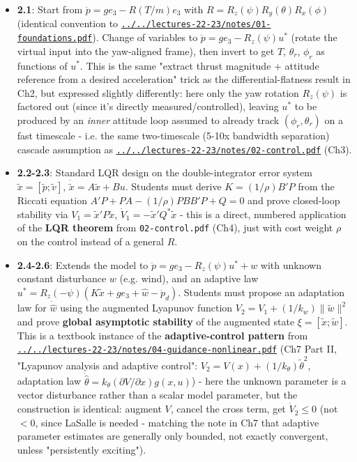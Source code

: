 \documentclass[11pt]{article}
\begin{document}
\begin{itemize}
\item \textbf{2.1}: Start from $\ddot p = ge_3 - R(T/m)e_3$ with $R = R_z(\psi)R_y(\theta)R_x(\phi)$ (identical convention to \href{../../lectures-22-23/notes/01-foundations.pdf}{\texttt{../../lectures-22-23/notes/01-\allowbreak{}foundations.pdf}}). Change of variables to $\ddot p = ge_3 - R_z(\psi)u^*$ (rotate the virtual input into the yaw-aligned frame), then invert to get $T$, $\theta_r$, $\phi_r$ as functions of $u^*$. This is the same "extract thrust magnitude + attitude reference from a desired acceleration" trick as the differential-flatness result in Ch2, but expressed slightly differently: here only the yaw rotation $R_z(\psi)$ is factored out (since it's directly measured/controlled), leaving $u^*$ to be produced by an \textit{inner} attitude loop assumed to already track $(\phi_r, \theta_r)$ on a fast timescale - i.e. the same two-timescale (5-10x bandwidth separation) cascade assumption as \href{../../lectures-22-23/notes/02-control.pdf}{\texttt{../../lectures-22-23/notes/02-\allowbreak{}control.pdf}} (Ch3).
\item \textbf{2.2-2.3}: Standard LQR design on the double-integrator error system $\tilde x=[\tilde p;\tilde v]$, $\dot{\tilde x}=A\tilde x+Bu$. Students must derive $K=(1/\rho)B'P$ from the Riccati equation $A'P+PA-(1/\rho)PBB'P+Q=0$ and prove closed-loop stability via $V_1=\tilde x'P\tilde x$, $\dot V_1=-\tilde x'Q^*\tilde x$ - this is a direct, numbered application of the \textbf{LQR theorem} from \texttt{02-\allowbreak{}control.pdf} (Ch4), just with cost weight $\rho$ on the control instead of a general $R$.
\item \textbf{2.4-2.6}: Extends the model to $\ddot p = ge_3 - R_z(\psi)u^* + w$ with unknown constant disturbance $w$ (e.g. wind), and an adaptive law $u^* = R_z(-\psi)(K\tilde x+ge_3+\hat w-\ddot p_d)$. Students must propose an adaptation law for $\dot{\hat w}$ using the augmented Lyapunov function $V_2=V_1+(1/k_w)\|\tilde w\|^2$ and prove \textbf{global asymptotic stability} of the augmented state $\xi=[\tilde x;\tilde w]$. This is a textbook instance of the \textbf{adaptive-control pattern} from \href{../../lectures-22-23/notes/04-guidance-nonlinear.pdf}{\texttt{../../lectures-22-23/notes/04-\allowbreak{}guidance-\allowbreak{}nonlinear.pdf}} (Ch7 Part II, "Lyapunov analysis and adaptive control": $V_2=V(x)+(1/k_\theta)\tilde\theta^2$, adaptation law $\dot{\hat\theta}=k_\theta(\partial V/\partial x)g(x,u)$) - here the unknown parameter is a vector disturbance rather than a scalar model parameter, but the construction is identical: augment $V$, cancel the cross term, get $\dot V_2\leq 0$ (not $<0$, since LaSalle is needed - matching the note in Ch7 that adaptive parameter estimates are generally only bounded, not exactly convergent, unless "persistently exciting").

\end{itemize}
\end{document}

